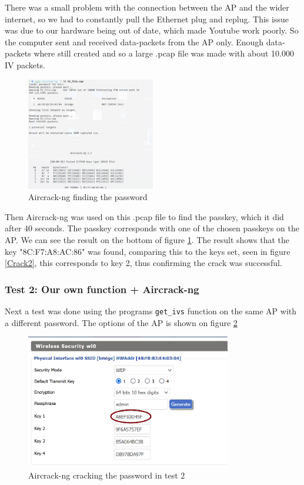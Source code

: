 There was a small problem with the connection between the AP and the wider internet, so we had to constantly pull the Ethernet plug and replug. This issue was due to our hardware being out of date, which made Youtube work poorly. So the computer sent and received data-packets from the AP only. Enough data-packets where still created and so a large .pcap file was made with about 10.000 IV packets. 

\begin{figure}[H]
    \centering
    \includegraphics[width=0.5\textwidth]{Latex-Files/Billeder/Kode1.png}
    \caption{Aircrack-ng finding the password}
    \label{Crack1}
\end{figure}


Then Aircrack-ng was used on this .pcap file to find the passkey, which it did after 40 seconds. The passkey corresponds with one of the chosen passkeys on the AP. We can see the result on the bottom of figure \ref{Crack1}. The result shows that the key "8C:F7:A8:AC:86" was found, comparing this to the keys set, seen in figure \ref{Crack2}, this corresponds to key 2, thus confirming the crack was successful.
\subsubsection{Test 2: Our own function + Aircrack-ng}
Next a test was done using the programs \lstinline{get_ivs} function on the same AP with a different password. The options of the AP is shown on figure \ref{Crack3} 
\begin{figure}[!htbp]
    \centering
    \includegraphics[width=0.8\textwidth]{Latex-Files/Billeder/Tests/WEP1.png}
    \caption{Aircrack-ng cracking the password in test 2}
    \label{Crack3}
\end{figure}

